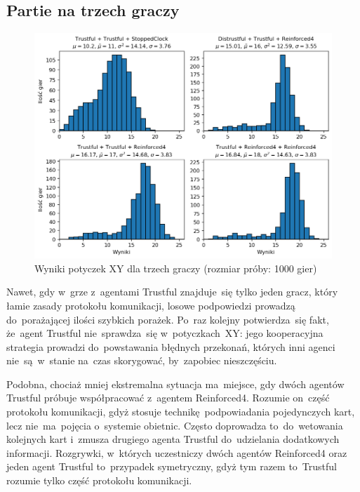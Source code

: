 \documentclass[declaration,shortabstract,inz]{iithesis}
\begin{document}
\subsection*{Partie na trzech graczy}

\begin{figure}[H]
	\centering
	\captionsetup{format=hang}
	\includegraphics[width=\textwidth,height=\textheight,keepaspectratio]{XY3.png}
	\caption[Caption]{Wyniki potyczek XY dla trzech graczy (rozmiar próby: 1000 gier)}
	\label{fig:XY3}
\end{figure}

Nawet, gdy w~grze z~agentami Trustful znajduje~się tylko jeden gracz, który łamie zasady protokołu komunikacji, losowe podpowiedzi prowadzą do~porażającej ilości szybkich porażek. Po~raz kolejny potwierdza~się fakt, że~agent Trustful nie~sprawdza~się w~potyczkach~XY: jego kooperacyjna strategia prowadzi do~powstawania błędnych przekonań, których inni agenci nie~są~w~stanie na~czas skorygować, by~zapobiec nieszczęściu.

Podobna, chociaż mniej ekstremalna sytuacja ma~miejsce, gdy dwóch agentów Trustful próbuje współpracować z~agentem Reinforced4. Rozumie on~część protokołu komunikacji, gdyż stosuje technikę podpowiadania pojedynczych kart, lecz nie~ma~pojęcia o~systemie obietnic. Często doprowadza to~do~wetowania kolejnych kart i~zmusza drugiego agenta Trustful do~udzielania dodatkowych informacji. Rozgrywki, w~których uczestniczy dwóch agentów Reinforced4 oraz jeden agent Trustful to~przypadek symetryczny, gdyż tym razem to~Trustful rozumie tylko część protokołu komunikacji.
\end{document}
